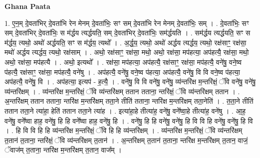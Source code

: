 \documentclass[17pt]{extarticle}
\begin{document}
\textbf{Ghana Paata } \newline

1. ए॒न॒म् दे॒वता॑भिर् दे॒वता॑भि रेन मेनम् दे॒वता॑भिः॒ सꣳ सम् दे॒वता॑भि रेन मेनम् दे॒वता॑भिः॒ सम् । . दे॒वता॑भिः॒ सꣳ सम् दे॒वता॑भिर् दे॒वता॑भिः॒ स म॑र्द्धय त्यर्द्धयति॒ सम् दे॒वता॑भिर् दे॒वता॑भिः॒ सम॑र्द्धयति । . सम॑र्द्धय त्यर्द्धयति॒ सꣳ स म॑र्द्धय॒ त्यथो॒ अथो॑ अर्द्धयति॒ सꣳ स म॑र्द्धय॒ त्यथो᳚ । . अ॒र्द्ध॒य॒ त्यथो॒ अथो॑ अर्द्धय त्यर्द्धय॒ त्यथो॒ रक्ष॑साꣳ॒॒ रक्ष॑सा॒ मथो॑ अर्द्धय त्यर्द्धय॒ त्यथो॒ रक्ष॑साम् । . अथो॒ रक्ष॑साꣳ॒॒ रक्ष॑सा॒ मथो॒ अथो॒ रक्ष॑सा॒ मप॑हत्या॒ अप॑हत्यै॒ रक्ष॑सा॒ मथो॒ अथो॒ रक्ष॑सा॒ मप॑हत्यै । . अथो॒ इत्यथो᳚ । . रक्ष॑सा॒ मप॑हत्या॒ अप॑हत्यै॒ रक्ष॑साꣳ॒॒ रक्ष॑सा॒ मप॑हत्यै॒ वने॑षु॒ वने॒ष्व प॑हत्यै॒ रक्ष॑साꣳ॒॒ रक्ष॑सा॒ मप॑हत्यै॒ वने॑षु । . अप॑हत्यै॒ वने॑षु॒ वने॒ष्व प॑हत्या॒ अप॑हत्यै॒ वने॑षु॒ वि वि वने॒ष्व प॑हत्या॒ अप॑हत्यै॒ वने॑षु॒ वि । . अप॑हत्या॒ इत्यप॑ - ह॒त्यै॒ । . वने॑षु॒ वि वि वने॑षु॒ वने॑षु॒ व्य॑न्तरि॑क्ष म॒न्तरि॑क्षं॒ ॅवि वने॑षु॒ वने॑षु॒ व्य॑न्तरि॑क्षम् । . व्य॑न्तरि॑क्ष म॒न्तरि॑क्षं॒ ॅवि व्य॑न्तरि॑क्षम् ततान तताना॒ न्तरि॑क्षं॒ ॅवि व्य॑न्तरि॑क्षम् ततान । . अ॒न्तरि॑क्षम् ततान तताना॒ न्तरि॑क्ष म॒न्तरि॑क्षम् तता॒ने तीति॑ तताना॒ न्तरि॑क्ष म॒न्तरि॑क्षम् तता॒नेति॑ । . त॒ता॒ने तीति॑ ततान तता॒ने त्या॑हा॒ हेति॑ ततान तता॒ने त्या॑ह । . इत्या॑हा॒हे तीत्या॑ह॒ वने॑षु॒ वने᳚ष्वा॒हे तीत्या॑ह॒ वने॑षु । . आ॒ह॒ वने॑षु॒ वने᳚ष्वा हाह॒ वने॑षु॒ हि हि वने᳚ष्वा हाह॒ वने॑षु॒ हि । . वने॑षु॒ हि हि वने॑षु॒ वने॑षु॒ हि वि वि हि वने॑षु॒ वने॑षु॒ हि वि । . हि वि वि हि हि व्य॑न्तरि॑क्ष म॒न्तरि॑क्षं॒ ॅवि हि हि व्य॑न्तरि॑क्षम् । . व्य॑न्तरि॑क्ष म॒न्तरि॑क्षं॒ ॅवि व्य॑न्तरि॑क्षम् त॒तान॑ त॒ताना॒ न्तरि॑क्षं॒ ॅवि व्य॑न्तरि॑क्षम् त॒तान॑ । . अ॒न्तरि॑क्षम् त॒तान॑ त॒ताना॒ न्तरि॑क्ष म॒न्तरि॑क्षम् त॒तान॒ वाजं॒ ॅवाज॑म् त॒ताना॒ न्तरि॑क्ष म॒न्तरि॑क्षम् त॒तान॒ वाज᳚म् । \newline
\end{document}
